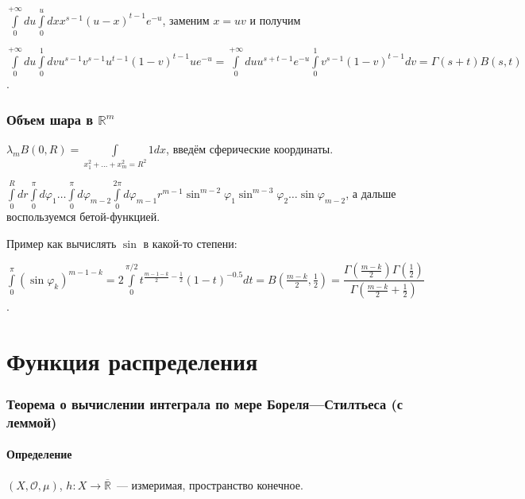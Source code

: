 \documentclass{article}
\begin{document}
            $\int\limits^{+\infty}_0 du \int\limits^u_0 dx x^{s - 1} (u - x)^{t - 1} e^{-u}$, заменим $x = uv$ и получим
            
            $\int\limits^{+\infty}_0 du \int\limits^1_0 dv u^{s - 1} v^{s - 1} u^{t - 1} (1 - v)^{t - 1} u e^{-u} = \int\limits^{+\infty}_0 du u^{s + t - 1} e^{-u} \int\limits^1_0 v^{s - 1}(1 - v)^{t - 1}dv = \Gamma(s + t) B(s, t)$.
       
    \newpage
    
    \section{Объем шара в $\mathbb R^m$}
    
        $\lambda_m B(0, R) = \int\limits_{x_1^2 + \ldots + x_m^2 = R^2} 1 dx$, введём сферические координаты.
        
        $\int\limits^R_0 dr \int\limits^{\pi}_0d\varphi_1 \ldots \int\limits^{\pi}_0 d \varphi_{m - 2} \int\limits^{2 \pi}_0 d \varphi_{m - 1} r^{m - 1} \sin^{m - 2} \varphi_1 \sin^{m - 3} \varphi_2 \ldots \sin \varphi_{m - 2}$, а дальше воспользуемся бетой-функцией.
        
        Пример как вычислять $\sin$ в какой-то степени:
        
        $\int\limits^{\pi}_0 \left(\sin \varphi_k \right)^{m - 1 - k} = 2 \int\limits^{\pi / 2}_0 t^{\frac{m - 1 - k}{2} - \frac{1}{2}} (1 - t)^{-0.5} dt = B \left( \frac{m - k}{2}, \frac{1}{2} \right) =\dfrac{\Gamma\left( \frac{m - k}{2} \right) \Gamma\left( \frac{1}{2} \right)}{\Gamma \left( \frac{m - k}{2} + \frac{1}{2} \right)}$.
   
\newpage

\part{Функция распределения}

\newpage

    \section{Теорема о вычислении интеграла по мере Бореля---Стилтьеса (с леммой)}
    
        \subsection{Определение}
        
            $\left( X, \mathcal{O}, \mu \right)$, $h : X \rightarrow \overline{\mathbb{R}}$~--- измеримая, пространство конечное.
    
\end{document}
